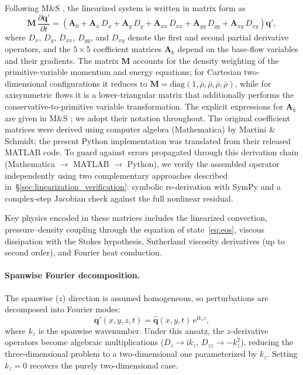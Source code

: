 \documentclass[11pt]{article}
\newcommand{\pp}{\partial}
\newcommand{\bq}{\mathbf{q}}
\newcommand{\bqp}{\mathbf{q}'}
\newcommand{\bA}{\mathbf{A}}
\newcommand{\bM}{\mathbf{M}}
\begin{document}
Following M\&S \cite{martini2024}, the linearized system is written in matrix form as
\begin{equation}
  \bM\,\frac{\pp\bqp}{\pp t}
  = \left(
      \bA_0
    + \bA_x\,D_x
    + \bA_y\,D_y
    + \bA_{xx}\,D_{xx}
    + \bA_{yy}\,D_{yy}
    + \bA_{xy}\,D_{xy}
  \right)\bqp,
  \label{eq:lnse_matrix}
\end{equation}
where $D_x$, $D_y$, $D_{xx}$, $D_{yy}$, and $D_{xy}$ denote the first and second partial derivative operators, and the $5\times5$ coefficient matrices $\bA_k$ depend on the base-flow variables and their gradients.
The matrix $\bM$ accounts for the density weighting of the primitive-variable momentum and energy equations; for Cartesian two-dimensional configurations it reduces to $\bM = \mathrm{diag}(1,\bar\rho,\bar\rho,\bar\rho,\bar\rho)$, while for axisymmetric flows it is a lower-triangular matrix that additionally performs the conservative-to-primitive variable transformation.
The explicit expressions for $\bA_k$ are given in M\&S \cite{martini2024}; we adopt their notation throughout.
The original coefficient matrices were derived using computer algebra (Mathematica) by Martini \& Schmidt; the present Python implementation was translated from their released MATLAB code.
To guard against errors propagated through this derivation chain (Mathematica $\to$ MATLAB $\to$ Python), we verify the assembled operator independently using two complementary approaches described in~\S\ref{sec:linearization_verification}: symbolic re-derivation with SymPy and a complex-step Jacobian check against the full nonlinear residual.

Key physics encoded in these matrices includes the linearized convection, pressure--density coupling through the equation of state~\eqref{eq:eos}, viscous dissipation with the Stokes hypothesis, Sutherland viscosity derivatives (up to second order), and Fourier heat conduction.

\paragraph{Spanwise Fourier decomposition.}
The spanwise ($z$) direction is assumed homogeneous, so perturbations are decomposed into Fourier modes:
\begin{equation}
  \bqp(x,y,z,t) = \hat{\bq}(x,y,t)\,\mathrm{e}^{\mathrm{i} k_z z},
  \label{eq:spanwise_fourier}
\end{equation}
where $k_z$ is the spanwise wavenumber.
Under this ansatz, the $z$-derivative operators become algebraic multiplications ($D_z \to \mathrm{i}k_z$, $D_{zz} \to -k_z^2$), reducing the three-dimensional problem to a two-dimensional one parameterized by $k_z$.
Setting $k_z = 0$ recovers the purely two-dimensional case.
\end{document}
